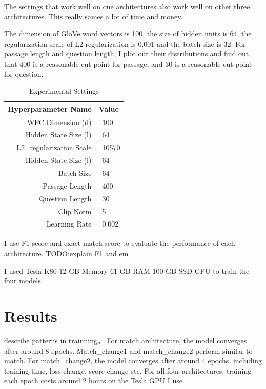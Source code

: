 \documentclass[modernstyle,12pt]{sjsuthesis}
\theoremstyle{definition}
\begin{document}
The settings that work well on one architectures also work well on other three architectures. This really sames a lot of time and money.

The dimension of GloVe word vectors is 100, the size of hidden units is 64, the regularization scale of L2-regularization is 0.001 and the batch size is 32. For passage length and question length, I plot out their distributions and find out that 400 is a reasonable cut point for passage, and 30 is a reasonable cut point for question.

\begin{table}[htbp]\centering
  \caption{Experimental Settings}
  \label{tab:dataset}
  \begin{tabular}{|r|l|} \hline
    Hyperparameter Name& Value \\ \hline\hline
    WFC Dimension (d) & \ 100 \\
    Hidden State Size (l) & \ 64 \\
    L2\_regularization Scale & \ 10570\\
    Hidden State Size (l) & \ 64\\
    Batch Size & \ 64\\
    Passage Length & \ 400\\
    Question Length & \ 30\\
    Clip Norm & \ 5\\
    Learning Rate & \ 0.002 \\ \hline
  \end{tabular}
\end{table}


I use F1 score and exact match score to evaluate the performance of each architecture. TODO:explain F1 and em

I used Tesla K80 12 GB Memory 61 GB RAM 100 GB SSD GPU to train the four models.

\section{Results}



describe patterns in trainning。 For match architecture, the model converges after around 8 epochs. Match\_change1 and match\_change2 perform similar to match. For match\_change2, the model converges after around 4 epochs.  including training time, loss change, score change etc. For all four architectures, training each epoch costs around 2 hours on the Tesla GPU I use.
\end{document}
